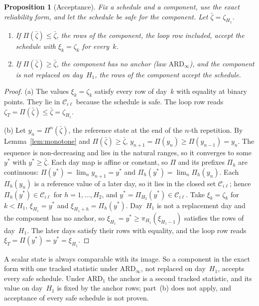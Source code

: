 \documentclass[11pt,a4paper]{article}
\theoremstyle{plain}
\newtheorem{proposition}[theorem]{Proposition}
\theoremstyle{definition}
\theoremstyle{remark}
\begin{document}
\begin{proposition}[Acceptance]\label{prop:acceptance}
Fix a schedule and a component, use the exact reliability form, and let the schedule be safe for the component.
Let $\bar\zeta = \zeta_{H_1}$.
\begin{enumerate}[nosep,label=(\alph*)]
  \item If $\Pi(\bar\zeta) \le \bar\zeta$, the rows of the component, the loop row included, accept the schedule with $\xi_k = \zeta_k$ for every~$k$.
  \item If $\Pi(\bar\zeta) \ge \bar\zeta$, the component has no anchor (law $\text{ARD}_\infty$), and the component is not replaced on day~$H_1$, the rows of the component accept the schedule.
\end{enumerate}
\end{proposition}
\begin{proof}
(a) The values $\xi_k = \zeta_k$ satisfy every row of day~$k$ with equality at binary points.
They lie in $\mathcal{C}_{i\ell}$ because the schedule is safe.
The loop row reads $\zeta_T = \Pi(\bar\zeta) \le \bar\zeta = \zeta_{H_1}$.

(b) Let $y_n = \Pi^n(\bar\zeta)$, the reference state at the end of the $n$-th repetition.
By Lemma~\ref{lem:monotone} and $\Pi(\bar\zeta) \ge \bar\zeta$, $y_{n+1} = \Pi(y_n) \ge \Pi(y_{n-1}) = y_n$.
The sequence is non-decreasing and lies in the natural ranges, so it converges to some $y^*$ with $y^* \ge \bar\zeta$.
Each day map is affine or constant, so $\Pi$ and its prefixes $\Pi_h$ are continuous: $\Pi(y^*) = \lim_n y_{n+1} = y^*$ and $\Pi_h(y^*) = \lim_n \Pi_h(y_n)$.
Each $\Pi_h(y_n)$ is a reference value of a later day, so it lies in the closed set $\mathcal{C}_{i\ell}$; hence $\Pi_h(y^*) \in \mathcal{C}_{i\ell}$ for $h = 1, \ldots, H_2$, and $y^* = \Pi_{H_2}(y^*) \in \mathcal{C}_{i\ell}$.
Take $\xi_k = \zeta_k$ for $k < H_1$, $\xi_{H_1} = y^*$ and $\xi_{H_1+h} = \Pi_h(y^*)$.
Day~$H_1$ is not a replacement day and the component has no anchor, so $\xi_{H_1} = y^* \ge \pi_{H_1}(\xi_{H_1-1})$ satisfies the rows of day~$H_1$.
The later days satisfy their rows with equality, and the loop row reads $\xi_T = \Pi(y^*) = y^* = \xi_{H_1}$.
\end{proof}

A scalar state is always comparable with its image.
So a component in the exact form with one tracked statistic under $\text{ARD}_\infty$, not replaced on day~$H_1$, accepts every safe schedule.
Under $\text{ARD}_1$ the anchor is a second tracked statistic, and its value on day~$H_1$ is fixed by the anchor rows; part~(b) does not apply, and acceptance of every safe schedule is not proven.
\end{document}
